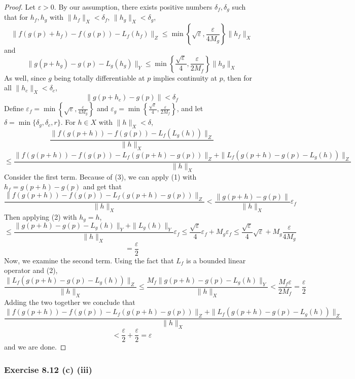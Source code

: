 \documentclass{article}
\theoremstyle{plain} %
\numberwithin{thm}{section} %
\theoremstyle{definition}
\begin{document}
\begin{proof}
		Let \(\varepsilon > 0\). By our assumption, there exists positive numbers \(\delta _f , \delta _g\) such that for \(h_f, h_g\) with \(\|h_f\| _X < \delta _f\), \(\|h_g\| _X < \delta _g\),
		\[
			\|f(g(p) + h_f) - f(g(p)) - L_f(h_f)\| _Z \leq \min \left\{\sqrt{\varepsilon}, \frac{\varepsilon}{4M_g}\right\} \|h_f\| _X \tag{1}
		\]
		and
		\[
			\|g(p+h_g) - g(p) - L_g(h_g)\| _Y \leq \min \left\{\frac{\sqrt{\varepsilon}}{4}, \frac{\varepsilon}{2M_f}\right\} \|h_g\| _X \tag{2}
		\]
		As well, since \(g\) being totally differentiable at \(p\) implies continuity at \(p\), then for all \(\|h_c\| _X < \delta _c\),
		\[
			\|g(p + h_c) - g(p)\| < \delta _f \tag{3}
		\]
		Define \(\varepsilon _f = \min \left\{\sqrt{\varepsilon}, \frac{\varepsilon}{4M_g}\right\}\) and \(\varepsilon _g = \min \left\{\frac{\sqrt{\varepsilon}}{4}, \frac{\varepsilon}{2M_f}\right\}\), and let \(\delta = \min \{\delta_g, \delta_c, r\}\). For \(h \in X\) with \(\|h\| _X < \delta\),
		\[
			\frac{\|f(g(p+h)) - f(g(p)) - L_f(L_g(h))\| _Z}{\|h\| _X}
		\]	
		\[
			\leq \frac{\|f(g(p+h)) - f(g(p)) - L_f(g(p + h) - g(p))\| _Z + \|L_f(g(p+h) - g(p) - L_g(h))\| _Z}{\|h\| _X}
		\]
		Consider the first term. Because of (3), we can apply (1) with \(h_f = g(p + h) - g(p)\) and get that
		\[
			\frac{\|f(g(p+h)) - f(g(p)) - L_f(g(p + h) - g(p))\| _Z}{\|h\| _X} < \frac{\|g(p+h) - g(p)\|}{\|h\| _X}\varepsilon _f
		\]
		Then applying (2) with \(h_g = h\),
		\[
			\leq \frac{\|g(p+h) - g(p) - L_g(h)\| _Y + \|L_g(h)\| _Y}{\|h\| _X}\varepsilon _f \leq \frac{\sqrt{\varepsilon}}{4}\varepsilon _f + M_g \varepsilon _f \leq \frac{\sqrt{\varepsilon}}{4}\sqrt{\varepsilon} + M_g \frac{\varepsilon}{4 M_g}
		\]
		\[
			= \frac{\varepsilon}{2}
		\]
		Now, we examine the second term. Using the fact that \(L_f\) is a bounded linear operator and (2),
		\[
			\frac{\|L_f(g(p+h) - g(p) - L_g(h))\| _Z}{\|h\| _X} \leq \frac{M_f \|g(p+h) - g(p) - L_g(h)\| _Y}{\|h\| _X} < \frac{M_f \varepsilon}{2M_f} = \frac{\varepsilon}{2}
		\]
		Adding the two together we conclude that
		\[
			\frac{\|f(g(p+h)) - f(g(p)) - L_f(g(p + h) - g(p))\| _Z + \|L_f(g(p+h) - g(p) - L_g(h))\| _Z}{\|h\| _X}
		\] 
		\[
			< \frac{\varepsilon}{2} + \frac{\varepsilon}{2} = \varepsilon
		\]
		and we are done.

	\end{proof}

    \subsubsection{Exercise 8.12 (c) (iii)}
\end{document}
